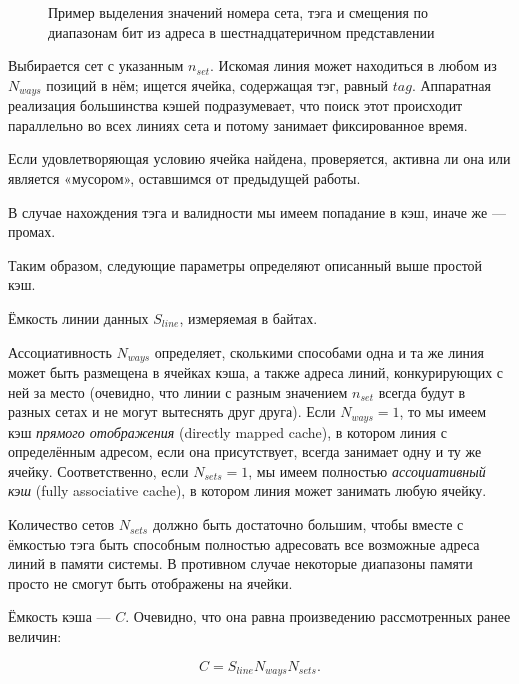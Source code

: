 \begin{enumerate*}
\begin{figure}[htb]
\begin{tikzpicture}[>=latex]
\end{tikzpicture}
    \caption[Пример выделения значений номера сета, тэга и смещения из адреса]{Пример выделения значений номера сета, тэга и смещения по диапазонам бит из адреса в шестнадцатеричном представлении}
    \label{fig:set-tag-flags}
\end{figure}


\item Выбирается сет с указанным $n_{set}$. Искомая линия может находиться в любом из $N_{ways}$ позиций в нём; ищется ячейка, содержащая тэг, равный $tag$. Аппаратная реализация большинства кэшей подразумевает, что поиск этот происходит параллельно во всех линиях сета и потому занимает фиксированное время.

\item Если удовлетворяющая условию ячейка найдена, проверяется, активна ли она или является «мусором», оставшимся от предыдущей работы.

\item В случае нахождения тэга и валидности мы имеем попадание в кэш, иначе же --- промах.
\end{enumerate*}

Таким образом, следующие параметры определяют описанный выше простой кэш.

\begin{itemize*}
\item Ёмкость линии данных $S_{line}$, измеряемая в байтах.
\item    Ассоциативность $N_{ways}$ определяет, сколькими способами одна и та же линия может быть размещена в ячейках кэша,  а также адреса линий, конкурирующих с ней за место (очевидно, что линии с разным значением $n_{set}$ всегда будут в разных сетах и не могут вытеснять друг друга). Если $N_{ways} = 1$, то мы имеем кэш \textit{прямого отображения} (\abbr directly mapped cache), в котором линия с определённым адресом, если она присутствует, всегда занимает одну и ту же ячейку. Соответственно, если $N_{sets} =1$, мы имеем полностью \textit{ассоциативный кэш} (\abbr fully associative cache), в котором линия может занимать любую ячейку.

\item    Количество сетов $N_{sets}$ должно быть достаточно большим, чтобы вместе с ёмкостью тэга быть способным полностью адресовать все возможные адреса линий в памяти системы. В противном случае некоторые диапазоны памяти просто не смогут быть отображены на ячейки.

\item    Ёмкость кэша --- $C$. Очевидно, что она равна произведению рассмотренных ранее величин:

$$C = S_{line}N_{ways} N_{sets}.$$
\end{itemize*}


